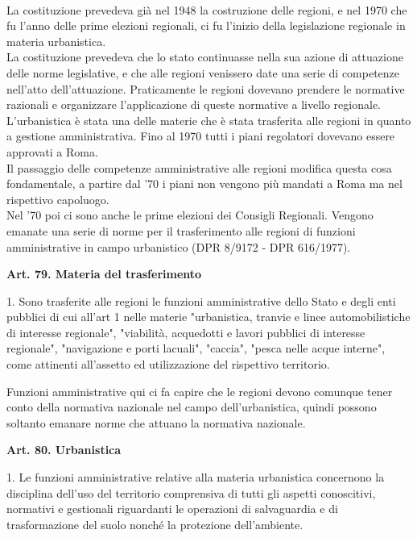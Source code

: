 \documentclass[a4paper,12pt, oneside]{book}
\begin{document}
\leavevmode\\ 
La costituzione prevedeva già nel 1948 la costruzione delle regioni, e nel 1970 che fu l'anno delle prime elezioni regionali, ci fu l'inizio della legislazione regionale in materia urbanistica.\\
La costituzione prevedeva che lo stato continuasse nella sua azione di attuazione delle norme legislative, e che alle regioni venissero date una serie di competenze nell'atto dell'attuazione. Praticamente le regioni dovevano prendere le normative razionali e organizzare l'applicazione di queste normative a livello regionale.\\
L'urbanistica è stata una delle materie che è stata trasferita alle regioni in quanto a gestione amministrativa. Fino al 1970 tutti i piani regolatori dovevano essere approvati a Roma.\\
Il passaggio delle competenze amministrative alle regioni modifica questa cosa fondamentale, a partire dal '70 i piani non vengono più mandati a Roma ma nel rispettivo capoluogo.\\
Nel '70 poi ci sono anche le prime elezioni dei Consigli Regionali. Vengono emanate una serie di norme per il trasferimento alle regioni di funzioni amministrative in campo urbanistico (DPR 8/9172 - DPR 616/1977).
\begin{displayquote}
	\textbf{Art. 79. Materia del trasferimento}
	
	1. Sono trasferite alle regioni le funzioni amministrative dello Stato e degli enti pubblici di cui all'art 1 nelle materie "urbanistica, tranvie e linee automobilistiche di interesse regionale", "viabilità, acquedotti e lavori pubblici di interesse regionale", "navigazione e porti lacuali", "caccia", "pesca nelle acque interne", come attinenti all'assetto ed utilizzazione del rispettivo territorio.
\end{displayquote}
Funzioni amministrative qui ci fa capire che le regioni devono comunque tener conto della normativa nazionale nel campo dell'urbanistica, quindi possono soltanto emanare norme che attuano la normativa nazionale.
\begin{displayquote}
\textbf{Art. 80. Urbanistica}

1. Le funzioni amministrative relative alla materia urbanistica concernono la disciplina dell'uso del territorio comprensiva di tutti gli aspetti conoscitivi, normativi e gestionali riguardanti le operazioni di salvaguardia e di trasformazione del suolo nonché la protezione dell'ambiente.
\end{displayquote}
\end{document}
